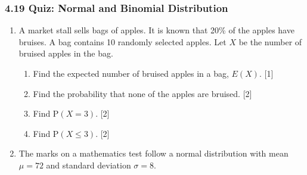 \documentclass[12pt, twoside]{article}
\begin{document}
\subsubsection*{4.19 Quiz: Normal and Binomial Distribution}

\begin{enumerate}[itemsep=0.15cm]

\item A market stall sells bags of apples. It is known that 20\% of the apples
      have bruises. A bag contains 10 randomly selected apples.
      Let $X$ be the number of bruised apples in the bag.

\begin{center}
\vspace{-0.3cm}
\vspace{-0.3cm}
\end{center}

\begin{enumerate}[itemsep=0.1cm]
  \item Find the expected number of bruised apples in a bag, $E(X)$. \hfill [1]
  \item Find the probability that none of the apples are bruised. \hfill [2]
  \item Find $\mathrm{P}(X = 3)$. \hfill [2]
  \item Find $\mathrm{P}(X \leq 3)$. \hfill [2]
\end{enumerate}


\newpage

\item The marks on a mathematics test follow a normal distribution
      with mean $\mu = 72$ and standard deviation $\sigma = 8$.


\end{enumerate}
\end{document}
